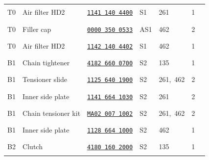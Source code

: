 \documentclass[10pt,letterpaper]{article}
\begin{document}
\begin{longtable}{@{}l>{\raggedright\arraybackslash}p{2.58in}p{1.23in}llrr@{}}
T0 & Air filter HD2 & \href{https://rduncangt.github.io/frk-management/parts/11411404400/}{\texttt{1141 140 4400}} & \textcolor{frkSupervision}{S1} & \textcolor{frkApplication}{\mbox{261}} & 1 & \rule{0.23in}{0.3pt}\\

\rowcolor{black!6}T0 & Filler cap & \href{https://rduncangt.github.io/frk-management/parts/00003500533/}{\texttt{0000 350 0533}} & \textcolor{frkSupervision}{AS1} & \textcolor{frkApplication}{\mbox{462}} & 2 & \rule{0.23in}{0.3pt}\\

T0 & Air filter HD2 & \href{https://rduncangt.github.io/frk-management/parts/11421404402/}{\texttt{1142 140 4402}} & \textcolor{frkSupervision}{S1} & \textcolor{frkApplication}{\mbox{462}} & 1 & \rule{0.23in}{0.3pt}\\

\rowcolor{black!6}B1 & Chain tightener & \href{https://rduncangt.github.io/frk-management/parts/41826600700/}{\texttt{4182 660 0700}} & \textcolor{frkSupervision}{S2} & \textcolor{frkApplication}{\mbox{135}} & 1 & \rule{0.23in}{0.3pt}\\

B1 & Tensioner slide & \href{https://rduncangt.github.io/frk-management/parts/11256401900/}{\texttt{1125 640 1900}} & \textcolor{frkSupervision}{S2} & \textcolor{frkApplication}{\mbox{261, 462}} & 2 & \rule{0.23in}{0.3pt}\\

\rowcolor{black!6}B1 & Inner side plate & \href{https://rduncangt.github.io/frk-management/parts/11416641030/}{\texttt{1141 664 1030}} & \textcolor{frkSupervision}{S2} & \textcolor{frkApplication}{\mbox{261}} & 2 & \rule{0.23in}{0.3pt}\\

B1 & Chain tensioner kit & \href{https://rduncangt.github.io/frk-management/parts/ma020071002/}{\texttt{MA02 007 1002}} & \textcolor{frkSupervision}{S2} & \textcolor{frkApplication}{\mbox{261, 462}} & 2 & \rule{0.23in}{0.3pt}\\

\rowcolor{black!6}B1 & Inner side plate & \href{https://rduncangt.github.io/frk-management/parts/11286641000/}{\texttt{1128 664 1000}} & \textcolor{frkSupervision}{S2} & \textcolor{frkApplication}{\mbox{462}} & 1 & \rule{0.23in}{0.3pt}\\

B2 & Clutch & \href{https://rduncangt.github.io/frk-management/parts/41801602000/}{\texttt{4180 160 2000}} & \textcolor{frkSupervision}{S2} & \textcolor{frkApplication}{\mbox{135}} & 1 & \rule{0.23in}{0.3pt}\\


\end{longtable}
\end{document}
